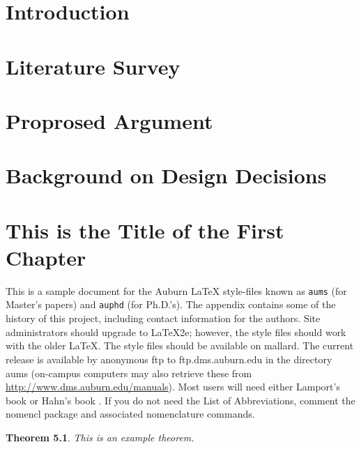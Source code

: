 \documentclass[12pt]{report}
\newtheorem{theorem}{Theorem}[chapter]
\begin{document}
\normalem       %

\chapter{\normalsize Introduction}


\chapter{\normalsize Literature Survey}


\chapter{\normalsize Proprosed Argument}


\chapter{\normalsize Background on Design Decisions}


\chapter{\normalsize This is the Title of the First Chapter}  %
This is a sample document for the Auburn \LaTeX{} style-files known
as {\tt aums} (for Master's papers) and {\tt auphd} (for Ph.D.'s).
The appendix contains some of the history of this project, including
contact information for the authors. 
Site administrators should upgrade to \LaTeX2e; however, the style files
should work with the older \LaTeX.  \vfill The style files should be available
on mallard.  The current release is available by anonymous ftp to
ftp.dms.auburn.edu in the directory aums (on-campus computers may
also retrieve these from \url{http://www.dms.auburn.edu/manuals}).
Most users will need either Lamport's book \cite{lamport} or Hahn's book
\cite{hahn}.%
If you do not need the List of Abbreviations, comment the nomencl package and associated nomenclature commands. 
\begin{theorem} This is an example theorem.
\end{theorem}%
\end{document}
